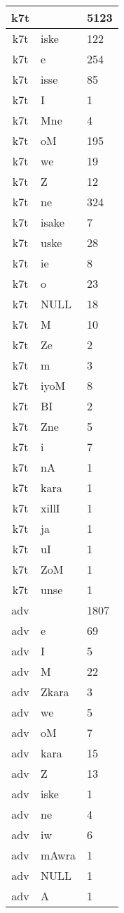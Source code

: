 \documentclass[a4 paper]{article}
\begin{document}
\begin{longtable}{cp{}p{}}
k7t &  & 5123\\ \midrule k7t & iske & 122\\ \midrule k7t & e & 254\\ \midrule k7t & isse & 85\\ \midrule k7t & I & 1\\ \midrule k7t & Mne & 4\\ \midrule k7t & oM & 195\\ \midrule k7t & we & 19\\ \midrule k7t & Z & 12\\ \midrule k7t & ne & 324\\ \midrule k7t & isake & 7\\ \midrule k7t & uske & 28\\ \midrule k7t & ie & 8\\ \midrule k7t & o & 23\\ \midrule k7t & NULL & 18\\ \midrule k7t & M & 10\\ \midrule k7t & Ze & 2\\ \midrule k7t & m & 3\\ \midrule k7t & iyoM & 8\\ \midrule k7t & BI & 2\\ \midrule k7t & Zne & 5\\ \midrule k7t & i & 7\\ \midrule k7t & nA & 1\\ \midrule k7t & kara & 1\\ \midrule k7t & xillI & 1\\ \midrule k7t & ja & 1\\ \midrule k7t & uI & 1\\ \midrule k7t & ZoM & 1\\ \midrule k7t & unse & 1\\ \midrule 
adv &  & 1807\\ \midrule adv & e & 69\\ \midrule adv & I & 5\\ \midrule adv & M & 22\\ \midrule adv & Zkara & 3\\ \midrule adv & we & 5\\ \midrule adv & oM & 7\\ \midrule adv & kara & 15\\ \midrule adv & Z & 13\\ \midrule adv & iske & 1\\ \midrule adv & ne & 4\\ \midrule adv & iw & 6\\ \midrule adv & mAwra & 1\\ \midrule adv & NULL & 1\\ \midrule adv & A & 1\\ \midrule 

\end{longtable}
\end{document}

